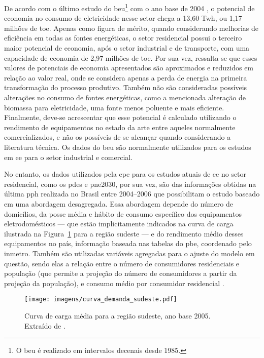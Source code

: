 De acordo com o último estudo do \gls{beu}\footnote{O \gls{beu} é
realizado em intervalos decenais desde 1985.} com o ano base de 2004
\cite{beu}, o potencial de economia no consumo de eletricidade nesse
setor chega a 13,60 T\acs{wh}, ou 1,17 milhões de \acs{toe}.
Apenas como figura de mérito, quando considerando melhorias de
eficiência em todas as fontes energéticas, o setor residencial possui
o terceiro maior potencial de economia, após o setor industrial e de
transporte, com uma capacidade de economia de 2,97 milhões de
\acs{toe}. Por sua vez, ressalta-se que esses valores de
potenciais de economia apresentados são aproximados e reduzidos em
relação ao valor real, onde se considera apenas a perda de energia na
primeira transformação do processo produtivo. Também não são
consideradas possíveis alterações no consumo de fontes energéticas,
como a mencionada alteração de biomassa para eletricidade, uma fonte
menos poluente e mais eficiente. Finalmente, deve-se acrescentar que
esse potencial é calculado utilizando o rendimento de equipamentos no
estado da arte entre aqueles normalmente comercializados, e não os
possíveis de se alcançar quando considerando a literatura técnica. Os
dados  do \gls{beu} são normalmente utilizados para os estudos em
\gls{ee} para o setor industrial e comercial.

No entanto, os dados utilizados pela \gls{epe} para os estudos atuais
de \gls{ee} no setor residencial, como os \glspl{pde} e \gls{pne2030},
por sua vez, são das informações obtidas na última \gls{pph} realizada
no Brasil entre 2004--2006 que possibilitam o estudo baseado em uma
abordagem desagregada. Essa abordagem depende do número de domicílios,
da posse média e hábito de consumo específico dos equipamentos
eletrodomésticos --- que estão implicitamente indicados na curva de
carga ilustrada na Figura~\ref{fig:curva_carga} para a região sudeste
--- e do rendimento médio desses equipamentos no país, informação
baseada nas tabelas do \gls{pbe}, coordenado pelo \gls{inmetro}.
Também são utilizadas variáveis agregadas para o ajuste do modelo em
questão, sendo elas a relação entre o número de consumidores
residenciais e população (que permite a projeção do número de
consumidores a partir da projeção da população), e consumo médio por
consumidor residencial
\cite{epe_eficiencia_2012,pde_2020,pne30_eff_energ}.

\begin{figure}[h!t]
\centering
\texttt{[image: imagens/curva\_demanda\_sudeste.pdf]}
\caption[Curva de carga média para a região sudeste, ano base 2005.]{Curva de
carga média para a região sudeste, ano base 2005. Extraído de
\cite{result_procel_2005}.}
\label{fig:curva_carga}
\end{figure}

